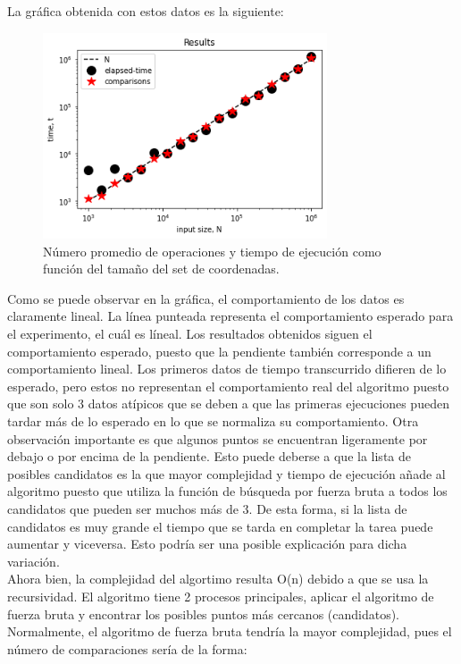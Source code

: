 La gráfica obtenida con estos datos es la siguiente:

\begin{figure}[H]
	\centering
	\includegraphics[keepaspectratio, width = 0.75\textwidth]{Graphic.png}
	\caption{
	  Número promedio de operaciones y tiempo de ejecución como función del tamaño del set de coordenadas.  
	}
	\label{fig:best}
\end{figure}
Como se puede observar en la gráfica, el comportamiento de los datos es claramente lineal. La línea punteada representa el comportamiento esperado para el experimento, el cuál es líneal. Los resultados obtenidos siguen el comportamiento esperado, puesto que la pendiente también corresponde a un comportamiento lineal. Los primeros datos de tiempo transcurrido difieren de lo esperado, pero estos no representan el comportamiento real del algoritmo puesto que son solo 3 datos atípicos que se deben a que las primeras ejecuciones pueden tardar más de lo esperado en lo que se normaliza su comportamiento. Otra observación importante es que algunos puntos se encuentran ligeramente por debajo o por encima de la pendiente. Esto puede deberse a que la lista de posibles candidatos es la que mayor complejidad y tiempo de ejecución añade al algoritmo puesto que utiliza la función de búsqueda por fuerza bruta a todos los candidatos que pueden ser muchos más de 3. De esta forma, si la lista de candidatos es muy grande el tiempo que se tarda en completar la tarea puede aumentar y viceversa. Esto podría ser una posible explicación para dicha variación. \\
Ahora bien, la complejidad del algortimo resulta O(n) debido a que se usa la recursividad. El algoritmo tiene 2 procesos principales, aplicar el algoritmo de fuerza bruta y encontrar los posibles puntos más cercanos (candidatos). Normalmente, el algoritmo de fuerza bruta tendría la mayor complejidad, pues el número de comparaciones sería de la forma:
